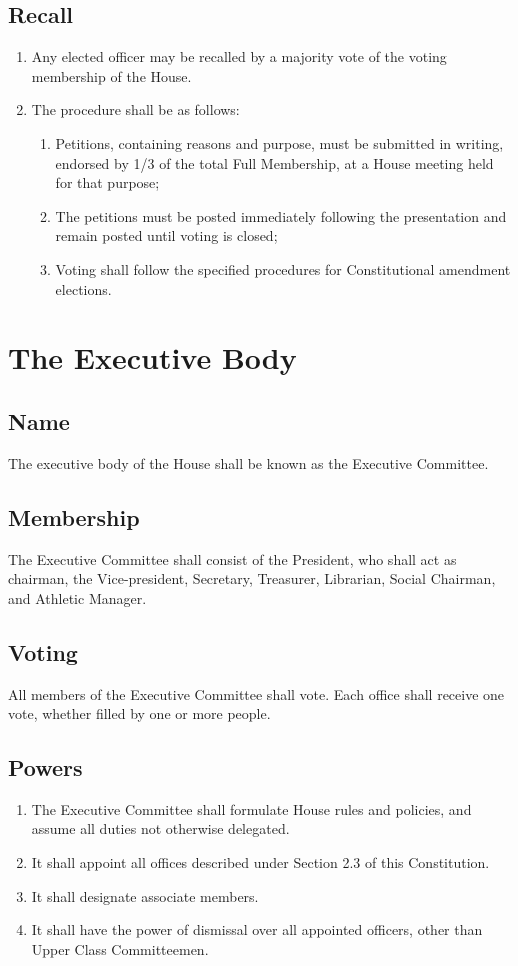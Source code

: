 \documentclass[10pt]{article} %
\begin{document}
\subsection{Recall}
\begin{enumerate}
\item Any elected officer may be recalled by a majority vote of the voting membership of the House. 
\item The procedure shall be as follows:
\begin{enumerate}
\item Petitions, containing reasons and purpose, must be submitted in writing, endorsed by 1/3 of the total Full Membership, at a House meeting held for that purpose;
\item The petitions must be posted immediately following the presentation and remain posted until voting is closed;
\item Voting shall follow the specified procedures for Constitutional amendment elections.
\end{enumerate}
\end{enumerate}
\section{The Executive Body}
\subsection{Name}
The executive body of the House shall be known as the Executive Committee.
\subsection{Membership}
The Executive Committee shall consist of the President, who shall act as chairman, the Vice-president, Secretary, Treasurer, Librarian, Social Chairman, and Athletic Manager.
\subsection{Voting}
All members of the Executive Committee shall vote. Each office shall receive one vote, whether filled by one or more people.
\subsection{Powers}
\begin{enumerate}
\item The Executive Committee shall formulate House rules and policies, and assume all duties not otherwise delegated.
\item It shall appoint all offices described under Section 2.3 of this Constitution.
\item It shall designate associate members.
\item It shall have the power of dismissal over all appointed officers, other than Upper Class Committeemen.
\end{enumerate}
\end{document}
